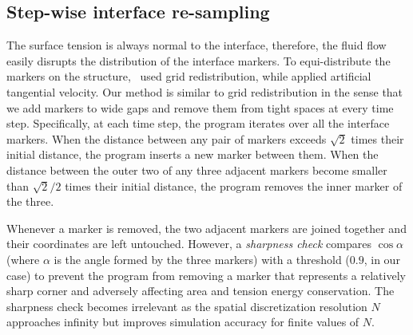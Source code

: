 \documentclass{jfm}
\begin{document}
\subsection{Step-wise interface re-sampling}
The surface tension is always normal to the interface, therefore, the fluid flow easily disrupts the distribution of the interface markers. To equi-distribute the markers on the structure,~\citet{lai2008immersed} used grid redistribution, while \citet{hou1994removing, lai2010numerical} applied artificial tangential velocity. Our method is similar to grid redistribution in the sense that we add markers to wide gaps and remove them from tight spaces at every time step. Specifically, at each time step, the program iterates over all the interface markers. When the distance between any pair of markers exceeds $\sqrt{2}$ times their initial distance, the program inserts a new marker between them. When the distance between the outer two of any three adjacent markers become smaller than $\sqrt{2}/2$ times their initial distance, the program removes the inner marker of the three. 

Whenever a marker is removed, the two adjacent markers are joined together and their coordinates are left untouched. However, a \textit{sharpness check} compares $\cos \alpha$ (where $\alpha$ is the angle formed by the three markers) with a threshold ($0.9$, in our case) to prevent the program from removing a marker that represents a relatively sharp corner and adversely affecting area and tension energy conservation. The sharpness check becomes irrelevant as the spatial discretization resolution $N$ approaches infinity but improves simulation accuracy for finite values of $N$. 
\end{document}
